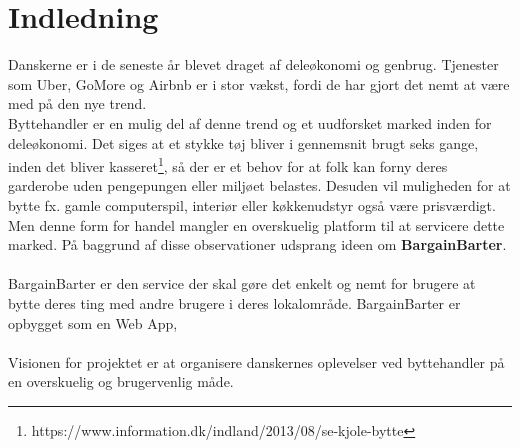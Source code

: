 \chapter{Indledning}
Danskerne er i de seneste år blevet draget af deleøkonomi og genbrug. Tjenester som Uber, GoMore og Airbnb er i stor vækst, fordi de har gjort det nemt at være med på den nye trend. \\
Byttehandler er en mulig del af denne trend og et uudforsket marked inden for deleøkonomi. Det siges at et stykke tøj bliver i gennemsnit brugt seks gange, inden det bliver kasseret\footnote{https://www.information.dk/indland/2013/08/se-kjole-bytte}, så der er et behov for at folk kan forny deres garderobe uden pengepungen eller miljøet belastes. Desuden vil muligheden for at bytte fx. gamle computerspil, interiør eller køkkenudstyr også være prisværdigt. Men denne form for handel mangler en overskuelig platform til at servicere dette marked. På baggrund af disse observationer udsprang ideen om \textbf{BargainBarter}. \\ \\ 
BargainBarter er den service der skal gøre det enkelt og nemt for brugere at bytte deres ting med andre brugere i deres lokalområde. BargainBarter er opbygget som en Web App, \\ \\
Visionen for projektet er at organisere danskernes oplevelser ved byttehandler på en overskuelig og brugervenlig måde. 